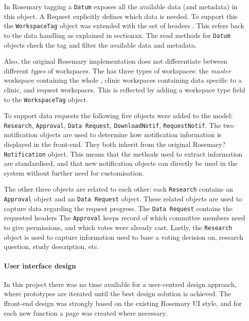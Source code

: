 
In Rosemary tagging a {\tt Datum} exposes all the available data (and metadata) in this object.
A Request explicitly defines which data is needed. 
To support this the {\tt WorkspaceTag} object was extended with the set of headers .
This refers back to the data handling as explained in section{xx}. The read methods for {\tt Datum} objects check the tag and filter the available data and metadata.

Also, the original Rosemary implementation does not differentiate between different \emph{types} of workspaces. 
The \ivfsystem{} has three types of  workspaces: the \emph{master} workspace containing the whole \projectdata{}, clinic workspaces containing data specific to a clinic, and request workspaces.
This is reflected by adding a workspace type field to the {\tt WorkspaceTag} object.

To support data requests the following five objects were added to the model: {\tt Research}, {\tt Approval}, {\tt Data Request}, {\tt DownloadNotif}, {\tt RequestNotif}.
The two notification objects are used to determine how notification information is displayed in the front-end. They both inherit from the original Rosemary? {\tt Notification} object.
This means that the methods used to extract information are standardised, and that new notification objects can directly be used in the system without further need for customisation.

The other three objects are related to each other: each {\tt Research} contains an {\tt Approval} object and an {\tt Data Request} object.
These related objects are used to capture data regarding the request progress.
The {\tt Data Request} contains the requested headers 
The {\tt Approval} keeps record of which committee members  need to give permissions, and which votes were already cast.
Lastly, the {\tt Research} object is used to capture information used to base a voting decision on, \eg{} research question, study description, etc.

\paragraph{User interface design}
In this project there was no time available for a user-centred design approach, where prototypes are iterated until the best design solution is achieved.
The ffront-end design was strongly based on the existing Rosemary UI style, and for each new function a page was created where necessary.

